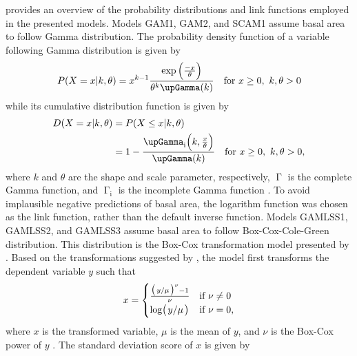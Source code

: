  provides an overview of the probability distributions and link functions employed in the presented models.  Models GAM1, GAM2, and SCAM1 assume basal area to follow Gamma distribution.  The probability density function of a variable following Gamma distribution is given by
\begin{equation}
  \label{eq:GammaDistributionPDF}
  P(X = x|k, \theta) = x^{k - 1} \frac{\exp{\Bigl(\frac{-x}{\theta}\Bigr)}}{\theta^k \upGamma(k)} \quad \text{for } x \geq 0, ~ k, \theta > 0
\end{equation}
while its  cumulative distribution function is given by
\begin{equation}
  \label{eq:GammaDistributionCDF}
  \begin{aligned}[b]
    D(X = x|k, \theta) &= P(X \leq x|k, \theta) \\
    &= 1 - \frac{\upGamma_{\text{i}}\Bigl(k, \frac{x}{\theta}\Bigr)}{\upGamma(k)} \quad \text{for } x \geq 0, ~ k, \theta > 0,
  \end{aligned}
\end{equation}
where \(k\) and \(\theta\) are the shape and scale parameter, respectively, \(\upGamma\) is the complete Gamma function, and \(\upGamma_{\text{i}}\) is the incomplete Gamma function \parencite{Weisstein2017b,Dormann2013,Lindgren1976}.  To avoid implausible negative predictions of basal area, the logarithm function was chosen as the link function, rather than the default inverse function.  Models GAMLSS1, GAMLSS2, and GAMLSS3 assume basal area to follow Box-Cox-Cole-Green distribution. This distribution is the Box-Cox transformation model presented by \textcite{Cole1992} \parencite{Stasinopoulos2007}.  Based on the transformations suggested by \textcite{Box1964}, the model first transforms the dependent variable \(y\) such that
\begin{equation}
  \label{eq:BoxCoxColeGreenTransformation}
  x =
  \begin{cases}
    \frac{
      \bigl(\left.
        y \middle/ \mu
      \right.\bigr)^\nu - 1}{\nu} &\text{if } \nu \not = 0 \\
    \log\bigl(\left.y \middle/ \mu\right.\bigr) &\text{if } \nu = 0,
  \end{cases}
\end{equation}
where \(x\) is the transformed variable, \(\mu\) is the mean of \(y\),
and \(\nu\) is the Box-Cox power of \(y\) \parencite{Cole1992}.
The standard deviation score of \(x\) is given by
